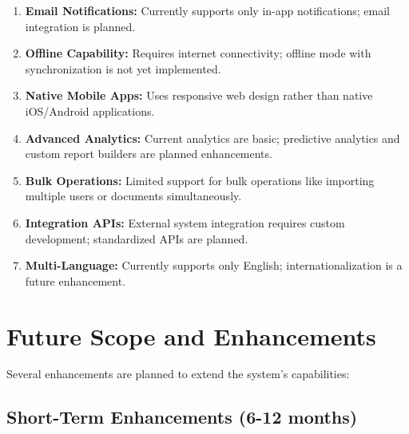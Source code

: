 \begin{enumerate}
\item \textbf{Email Notifications:} Currently supports only in-app notifications; email integration is planned.

\item \textbf{Offline Capability:} Requires internet connectivity; offline mode with synchronization is not yet implemented.

\item \textbf{Native Mobile Apps:} Uses responsive web design rather than native iOS/Android applications.

\item \textbf{Advanced Analytics:} Current analytics are basic; predictive analytics and custom report builders are planned enhancements.

\item \textbf{Bulk Operations:} Limited support for bulk operations like importing multiple users or documents simultaneously.

\item \textbf{Integration APIs:} External system integration requires custom development; standardized APIs are planned.

\item \textbf{Multi-Language:} Currently supports only English; internationalization is a future enhancement.
\end{enumerate}

\section{Future Scope and Enhancements}

Several enhancements are planned to extend the system's capabilities:

\subsection{Short-Term Enhancements (6-12 months)}

